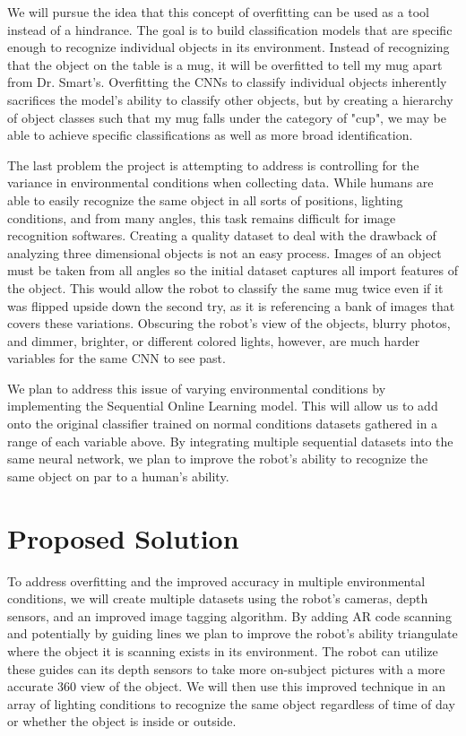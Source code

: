 \documentclass[a4paper, 10pt]{article}
\begin{document}
We will pursue the idea that this concept of overfitting can be used as a tool instead of a hindrance. The goal is to build classification models that are specific enough to recognize individual objects in its environment. Instead of recognizing that the object on the table is a mug, it will be overfitted to tell my mug apart from Dr. Smart's. Overfitting the CNNs to classify individual objects inherently sacrifices the model's ability to classify other objects, but by creating a hierarchy of object classes such that my mug falls under the category of "cup", we may be able to achieve specific classifications as well as more broad identification. 

The last problem the project is attempting to address is controlling for the variance in environmental conditions when collecting data. While humans are able to easily recognize the same object in all sorts of positions, lighting conditions, and from many angles, this task remains difficult for image recognition softwares. Creating a quality dataset to deal with the drawback of analyzing three dimensional objects is not an easy process. Images of an object must be taken from all angles so the initial dataset captures all import features of the object. This would allow the robot to classify the same mug twice even if it was flipped upside down the second try, as it is referencing a bank of images that covers these variations. Obscuring the robot's view of the objects, blurry photos, and dimmer, brighter, or different colored lights, however, are much harder variables for the same CNN to see past. 

We plan to address this issue of varying environmental conditions by implementing the Sequential Online Learning model. This will allow us to add onto the original classifier trained on normal conditions datasets gathered in a range of each variable above. By integrating multiple sequential datasets into the same neural network, we plan to improve the robot's ability to recognize the same object on par to a human's ability. 

\section{Proposed Solution}
To address overfitting and the improved accuracy in multiple environmental conditions, we will create multiple datasets using the robot's cameras, depth sensors, and an improved image tagging algorithm. By adding AR code scanning and potentially by guiding lines we plan to improve the robot's ability triangulate where the object it is scanning exists in its environment. The robot can utilize these guides can its depth sensors to take more on-subject pictures with a more accurate 360 view of the object. We will then use this improved technique in an array of lighting conditions to recognize the same object regardless of time of day or whether the object is inside or outside.
\end{document}
